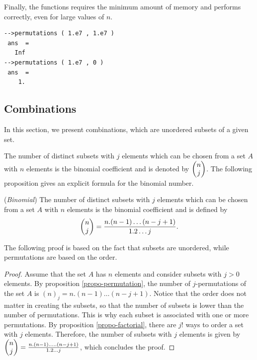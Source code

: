 Finally, the  functions requires the minimum amount of memory
and performs correctly, even for large values of $n$.
\lstset{language=scilabscript}
\begin{lstlisting}
-->permutations ( 1.e7 , 1.e7 )
 ans  =
   Inf  
-->permutations ( 1.e7 , 0 )
 ans  =
    1.  
\end{lstlisting}

\subsection{Combinations}
\label{section-combinaison}

In this section, we present combinations, which are unordered subsets
of a given set.

The number of distinct subsets with $j$ elements which can be chosen from
a set $A$ with $n$ elements is the binomial coefficient and is denoted by 
$\choosefun{n}{j}$. The following proposition gives an explicit formula 
for the binomial number.

\begin{proposition}
(\emph{Binomial})
The number of distinct subsets with $j$ elements which can be chosen from
a set $A$ with $n$ elements is the binomial coefficient and is defined by 
\begin{eqnarray}
\label{introstats-eq-binomial}
\choosefun{n}{j} = \frac{n . (n-1) \ldots (n-j+1)}{1.2 \ldots j}.
\end{eqnarray}
\end{proposition}

The following proof is based on the fact that subsets are unordered, while 
permutations are based on the order.

\begin{proof}
Assume that the set $A$ has $n$ elements and consider subsets with $j>0$ elements.
By proposition \ref{propo-permutation}, the number of $j$-permutations of the set $A$ is 
$(n)_j = n . (n-1) \ldots (n-j+1)$.
Notice that the order does not matter in creating the subsets, so that the number 
of subsets is lower than the number of permutations.
This is why each subset is associated with one or more permutations.
By proposition \ref{propo-factorial}, there are $j!$ ways to order a 
set with $j$ elements. Therefore, the number of subsets with $j$ elements
is given by $\choosefun{n}{j} = \frac{n . (n-1) . \ldots . (n-j+1)}{1.2 \ldots j}$, 
which concludes the proof.
\end{proof}

